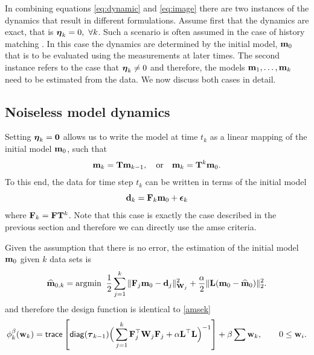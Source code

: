 \documentclass[11pt]{article}
\begin{document}
In combining equations \eqref{eq:dynamic} and \eqref{eq:image}  there are two instances of the 
dynamics that result in different formulations. 
Assume first that the dynamics are exact, that is $\bfeta_{k}=0, \ \forall  k$.
Such a scenario is often assumed in the case of history matching \cite{Oliver2010a}. In this
case the dynamics are determined by the initial model, ${\bf{m}}_{0}$ that is to be evaluated
using the measurements at later times. The second  instance refers to the case that
${\boldsymbol \eta}_{k} \not=0$ and therefore, the models ${\bf{m}}_{1},\ldots,{\bf{m}}_{k}$ need to be estimated
from the data. We now discuss both cases in detail. 

\subsection{Noiseless model dynamics}

Setting ${\boldsymbol \eta}_k = {\bf 0}$ allows us to 
write the model at time $t_k$ as a linear mapping of the initial model ${\bf{m}}_0$, such that
\begin{align*}
{\bf{m}}_{k} = {\bf{T}}{\bf{m}}_{k-1}, \quad {\rm or } \quad
{\bf{m}}_{k} = {\bf{T}}^{k}{\bf{m}}_0.
\end{align*} 
To this end, the data for time step $t_k$ can be written in terms of the initial model 
\begin{equation}
{\bf{d}}_k = {\bf{F}}_k{\bf{m}}_0 + {\boldsymbol \epsilon}_k
\end{equation}
where ${\bf{F}}_k = {\bf{F}}{\bf{T}}^{k}$.
Note that this case is exactly the case described in the previous section and therefore we can
directly use the amse criteria.

Given the assumption that there is no error, the estimation of the initial model ${\bf{m}}_0$ given $k$ data sets is 
\begin{equation}
\label{m0NoNoise}
{\widehat{{\bf{m}}}}_{0,k} ={\rm argmin } \;\; \frac12  \sum_{j=1}^{k}\| {\bf{F}}_{j}{\bf{m}}_0 - {\bf{d}}_j \|_{{\bf{W}}_j}^2 + \frac{\alpha}{2}\|{\bf{L}}({\bf{m}}_0 - {\widehat{{\bf{m}}}}_{0})\|_2^2.
\end{equation}
and therefore the design function is identical to \ref{amsek}
\begin{align}
\phi_{k}^{\beta}({\bf{w}}_{k}) =  {\sf trace} \left[  {\sf diag}({\boldsymbol \tau}_{k-1}) \Big(\sum_{j=1}^{k}{\bf{F}}_{j}^{\top}{\bf{W}}_{j}{\bf{F}}_{j}   +
\alpha {\bf{L}}^{\top}{\bf{L}}\Big)^{-1} \right] + \beta \sum {\bf{w}}_{k},\quad \quad 0 \le {\bf{w}}_i.
\end{align}
\end{document}

